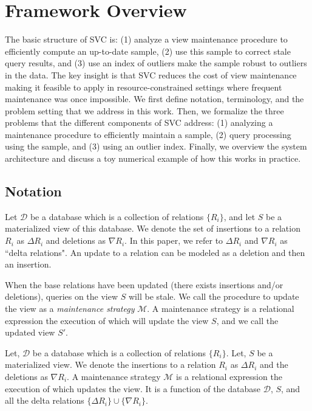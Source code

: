 \section{Framework Overview}\label{sec-arch}
The basic structure of SVC is: (1) analyze a view maintenance procedure to efficiently compute an up-to-date sample, (2) use this sample to correct stale query results, and (3) use an index of outliers make the sample robust to outliers in the data. 
The key insight is that SVC reduces the cost of view maintenance making it feasible to apply in resource-constrained settings where frequent maintenance was once impossible.
We first define notation, terminology, and the problem setting that we address in this work.
Then, we formalize the three problems that the different components of SVC address: (1) analyzing a maintenance procedure to efficiently maintain a sample, (2) query processing using the sample, and (3) using an outlier index.
Finally, we overview the system architecture and discuss a toy numerical example of how this works in practice.

\subsection{Notation}
Let $\mathcal{D}$ be a database which is a collection of relations $\{R_i\}$, and let $S$ be a materialized view of this database.
We denote the set of insertions to a relation $R_i$ as $\Delta R_i$ and deletions as $\nabla R_i$.
In this paper, we refer to $\Delta R_i$ and $\nabla R_i$ as ``delta relations".
An update to a relation can be modeled as a deletion and then an insertion.

When the base relations have been updated (there exists insertions and/or deletions), queries on the view $S$ will be stale.
We call the procedure to update the view as a \emph{maintenance strategy} $\mathcal{M}$.
A maintenance strategy is a relational expression the execution of which will update the view $S$, and we call the updated view $S'$.

\begin{definition}
Let, $\mathcal{D}$ be a database which is a collection of relations $\{R_i\}$.
Let, $S$ be a materialized view.
We denote the insertions to a relation $R_i$ as $\Delta R_i$ and the deletions as $\nabla R_i$.
A maintenance strategy $\mathcal{M}$ is a relational expression the execution of which updates the view.
It is a function of the database $\mathcal{D}$, $S$, and all the delta relations $\{\Delta R_i\} \cup \{\nabla R_i\}$.
\end{definition}

